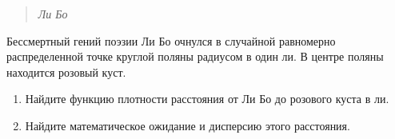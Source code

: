 \documentclass[12pt]{article} %
\begin{document}
\begin{enumerate}
\begin{minipage}{12cm}
\begin{quote}
    \hspace{7cm} \textit{Ли Бо}
    
  \end{quote}
\end{minipage} 
 
\vspace{0.3cm}

    Бессмертный гений поэзии Ли Бо очнулся в случайной равномерно распределенной точке круглой поляны радиусом в один ли. 
    В центре поляны находится розовый куст. 
    \begin{enumerate}
        \item Найдите функцию плотности расстояния от Ли Бо до розового куста в ли. 
        \item Найдите математическое ожидание и дисперсию этого расстояния.
    \end{enumerate}


\end{enumerate}
\end{document}
